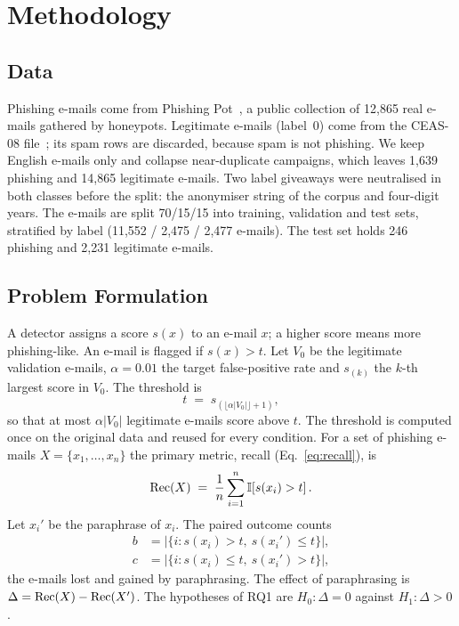 \section{Methodology}
\label{sec:method}

\subsection{Data}
\label{sec:method:data}
Phishing e-mails come from Phishing Pot~\cite{peixoto_phishing_pot_2026}, a public collection of 12,865 real e-mails gathered by honeypots. Legitimate e-mails (label~0) come from the CEAS-08 file~\cite{php4life_phishing_dataset}; its spam rows are discarded, because spam is not phishing. We keep English e-mails only and collapse near-duplicate campaigns, which leaves 1,639 phishing and 14,865 legitimate e-mails. Two label giveaways were neutralised in both classes before the split: the anonymiser string of the corpus and four-digit years. The e-mails are split 70/15/15 into training, validation and test sets, stratified by label (11,552 / 2,475 / 2,477 e-mails). The test set holds 246 phishing and 2,231 legitimate e-mails.

\subsection{Problem Formulation}
\label{sec:method:problem}
A detector assigns a score $s(x)$ to an e-mail $x$; a higher score means more phishing-like. An e-mail is flagged if $s(x)>t$. Let $V_0$ be the legitimate validation e-mails, $\alpha=0.01$ the target false-positive rate and $s_{(k)}$ the $k$-th largest score in $V_0$. The threshold is
\begin{equation}
  t \;=\; s_{(\lfloor \alpha |V_0| \rfloor + 1)},
  \label{eq:threshold}
\end{equation}
so that at most $\alpha|V_0|$ legitimate e-mails score above $t$. The threshold is computed once on the original data and reused for every condition. For a set of phishing e-mails $X=\{x_1,\dots,x_n\}$ the primary metric, recall (Eq.~\eqref{eq:recall}), is
\begin{equation}
  \mathrm{Rec}(X) \;=\; \frac{1}{n}\sum_{i=1}^{n}\mathbb{I}\!\left[s(x_i)>t\right].
  \label{eq:recall}
\end{equation}
Let $x_i'$ be the paraphrase of $x_i$. The paired outcome counts
\begin{align}
  b&=\bigl|\{i: s(x_i)>t,\ s(x_i')\le t\}\bigr|,\nonumber\\
  c&=\bigl|\{i: s(x_i)\le t,\ s(x_i')>t\}\bigr|,
  \label{eq:discordant}
\end{align}
the e-mails lost and gained by paraphrasing. The effect of paraphrasing is $\Delta=\mathrm{Rec}(X)-\mathrm{Rec}(X')$. The hypotheses of RQ1 are $H_0\colon \Delta=0$ against $H_1\colon \Delta>0$.

